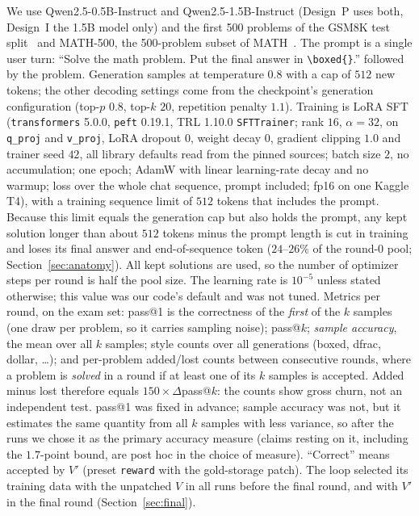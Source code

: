 \documentclass[runningheads]{llncs}
\begin{document}
We use Qwen2.5-0.5B-Instruct and Qwen2.5-1.5B-Instruct (Design~P uses both,
Design~I the 1.5B model only) and the first 500 problems of the GSM8K test
split~\cite{ref_gsm8k} and MATH-500, the 500-problem subset of
MATH~\cite{ref_math}. The prompt is a single user turn: ``Solve the math problem. Put the final answer in
\verb|\boxed{}|.'' followed by the problem. Generation samples at temperature
$0.8$ with a cap of $512$ new tokens; the other decoding settings come from the
checkpoint's generation configuration (top-$p$ $0.8$, top-$k$ $20$, repetition
penalty $1.1$). Training is LoRA SFT (\texttt{transformers} 5.0.0, \texttt{peft}
0.19.1, TRL 1.10.0 \texttt{SFTTrainer}; rank $16$, $\alpha=32$, on
\texttt{q\_proj} and \texttt{v\_proj}, LoRA dropout $0$, weight decay $0$, gradient
clipping $1.0$ and trainer seed $42$, all library defaults read from the pinned sources; batch size $2$, no accumulation; one epoch; AdamW with linear learning-rate
decay and no warmup; loss over the whole chat sequence, prompt included; fp16 on
one Kaggle T4), with a training sequence limit of $512$ tokens that includes the
prompt. Because this limit equals the generation cap but also holds the prompt,
any kept solution longer than about $512$ tokens minus the prompt length is cut
in training and loses its final answer and end-of-sequence token
($24$--$26\%$ of the round-0 pool; Section~\ref{sec:anatomy}). All kept
solutions are used, so the number of optimizer steps per round
is half the pool size. The learning rate is $10^{-5}$ unless stated otherwise;
this value was our code's default and was not tuned. Metrics per round, on the exam set: pass@1 is the
correctness of the \emph{first} of the $k$ samples (one draw per problem, so it
carries sampling noise); pass@$k$; \emph{sample accuracy}, the mean over all $k$
samples; style counts over all generations (boxed, dfrac, dollar, \dots); and
per-problem added/lost counts between consecutive rounds, where a problem is
\emph{solved} in a round if at least one of its $k$ samples is accepted. Added
minus lost therefore equals $150\times\Delta$pass@$k$: the counts show gross churn, not an independent test. pass@1 was
fixed in advance; sample accuracy was not, but it
estimates the same quantity from all $k$ samples with less variance, so after
the runs we chose it as the primary accuracy measure (claims resting on it, including the $1.7$-point bound, are post hoc in the choice of measure). ``Correct'' means accepted by $V'$ (preset \texttt{reward} with the gold-storage patch). The loop selected its training data with the unpatched $V$ in all runs before the final round, and with $V'$ in the final round (Section~\ref{sec:final}).
\end{document}
